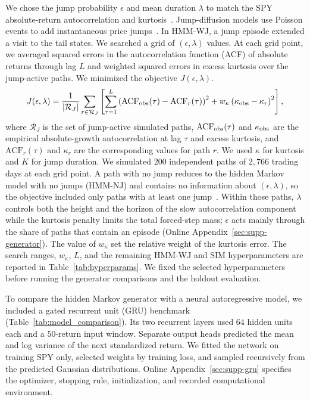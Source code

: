 We chose the jump probability $\epsilon$ and mean duration $\lambda$
to match the SPY absolute-return autocorrelation and
kurtosis~\cite{mandelbrot1963, cont2001,
rydenTerasvirtaAsbrink1998}. Jump-diffusion models use Poisson events to
add instantaneous price jumps~\cite{merton1976, kou2002}. In HMM-WJ, a
jump episode extended a visit to the tail states. We searched a grid of
$(\epsilon,\lambda)$ values. At each grid point, we averaged squared
errors in the autocorrelation function (ACF) of absolute returns through lag $L$ and
weighted squared errors in excess kurtosis over the jump-active paths.
We minimized the objective $J(\epsilon,\lambda)$.
\begin{equation}
    J(\epsilon, \lambda) =
    \frac{1}{|\mathcal{R}_J|}\sum_{r\in\mathcal{R}_J}
    \left[
    \sum_{\tau=1}^{L} \left( \mathrm{ACF}_{\rm obs}(\tau)
    - \mathrm{ACF}_{r}(\tau) \right)^2
    + w_\kappa \left( \kappa_{\rm obs} - \kappa_{r} \right)^2
    \right],
    \label{eq:grid_search}
\end{equation}
where $\mathcal{R}_J$ is the set of jump-active simulated paths,
$\mathrm{ACF}_{\rm obs}(\tau)$ and $\kappa_{\rm obs}$ are the empirical
absolute-growth autocorrelation at lag $\tau$ and excess kurtosis, and
$\mathrm{ACF}_{r}(\tau)$ and $\kappa_r$ are the corresponding values
for path $r$. We used $\kappa$ for kurtosis and $K$ for jump duration.
We simulated $200$ independent paths of $2{,}766$ trading days at
each grid point. A path with no jump reduces to the hidden Markov model
with no jumps (HMM-NJ) and contains no
information about $(\epsilon,\lambda)$, so the objective included only
paths with at least one jump~\cite{glasserman2003}. Within those
paths, $\lambda$ controls both the height and the horizon of the slow
autocorrelation component while the kurtosis penalty limits the total
forced-step mass; $\epsilon$ acts mainly through the share of paths
that contain an episode
(Online Appendix~\ref{sec:supp-generator}). The value of
$w_\kappa$ set the relative weight of the kurtosis error. The search ranges,
$w_\kappa$, $L$, and the remaining HMM-WJ and SIM hyperparameters are
reported in Table~\ref{tab:hyperparams}. We fixed the selected
hyperparameters before running the generator comparisons and the
holdout evaluation.

To compare the hidden Markov generator with a neural autoregressive
model, we included a gated recurrent unit (GRU) benchmark
(Table~\ref{tab:model_comparison}). Its two recurrent layers used
$64$ hidden units each and a $50$-return input window. Separate
output heads predicted the mean and log variance of the next
standardized return. We fitted the network on training SPY only,
selected weights by training loss, and sampled recursively from
the predicted Gaussian distributions. Online
Appendix~\ref{sec:supp-gru} specifies the optimizer, stopping rule,
initialization, and recorded computational environment.
